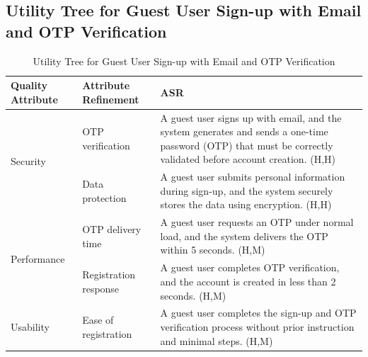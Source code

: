 \documentclass{article}
\begin{document}
\subsection{Utility Tree for Guest User Sign-up with Email and OTP Verification}

\begin{table}[H]
    \centering
    \caption{Utility Tree for Guest User Sign-up with Email and OTP Verification}
    \begin{tabular}{|p{3cm}|p{4cm}|p{7cm}|}
        \hline
        \textbf{Quality Attribute} & \textbf{Attribute Refinement}                                                                                                                                  & \textbf{ASR} \\
        \hline

        \multirow{2}{*}{Security}
                                   & OTP verification
                                   & A guest user signs up with email, and the system generates and sends a one-time password (OTP) that must be correctly validated before account creation. (H,H)                \\
        \cline{2-3}
                                   & Data protection
                                   & A guest user submits personal information during sign-up, and the system securely stores the data using encryption. (H,H)                                                     \\
        \hline

        \multirow{2}{*}{Performance}
                                   & OTP delivery time
                                   & A guest user requests an OTP under normal load, and the system delivers the OTP within 5 seconds. (H,M)                                                                       \\
        \cline{2-3}
                                   & Registration response
                                   & A guest user completes OTP verification, and the account is created in less than 2 seconds. (H,M)                                                                             \\
        \hline

        Usability
                                   & Ease of registration
                                   & A guest user completes the sign-up and OTP verification process without prior instruction and minimal steps. (H,M)                                                            \\
        \hline


\end{tabular}
\end{table}
\end{document}
